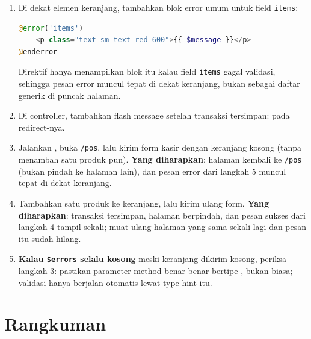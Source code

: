 \begin{enumerate}
\begin{lstlisting}[language=php, title=\lstfile{resources/views/pos/create.blade.php}]
@if (session('success'))
    <div class="bg-green-50 text-green-700 p-3 rounded-md mb-4">
        {{ session('success') }}
    </div>
@endif
    \end{lstlisting}
  \item Di dekat elemen keranjang, tambahkan blok error umum untuk field
    \texttt{items}:
    \begin{lstlisting}[language=php, title=\lstfile{resources/views/pos/create.blade.php}]
@error('items')
    <p class="text-sm text-red-600">{{ $message }}</p>
@enderror
    \end{lstlisting}
    Direktif  hanya menampilkan blok itu kalau
    field \texttt{items} gagal validasi, sehingga pesan error muncul
    tepat di dekat keranjang, bukan sebagai daftar generik di puncak
    halaman.
  \item Di controller, tambahkan flash message setelah transaksi
    tersimpan:  pada redirect-nya.
  \item Jalankan , buka \texttt{/pos}, lalu
    kirim form kasir dengan keranjang kosong (tanpa menambah satu produk
    pun). \textbf{Yang diharapkan}: halaman kembali ke \texttt{/pos}
    (bukan pindah ke halaman lain), dan pesan error dari langkah 5
    muncul tepat di dekat keranjang.
  \item Tambahkan satu produk ke keranjang, lalu kirim ulang form.
    \textbf{Yang diharapkan}: transaksi tersimpan, halaman berpindah,
    dan pesan sukses dari langkah 4 tampil sekali; muat ulang halaman
    yang sama sekali lagi dan pesan itu sudah hilang.
  \item \textbf{Kalau \texttt{\$errors} selalu kosong} meski keranjang
    dikirim kosong, periksa langkah 3: pastikan parameter method
     benar-benar bertipe
    , bukan  biasa;
    validasi hanya berjalan otomatis lewat type-hint itu.
\end{enumerate}


\section{Rangkuman}
\label{sec:validasi-input-rangkuman}

